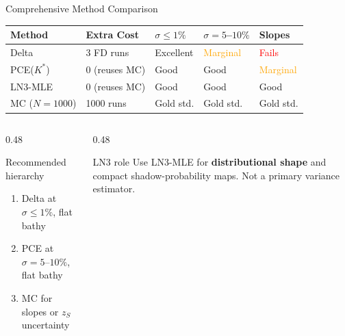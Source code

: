 \documentclass[aspectratio=169,12pt]{beamer}
\begin{document}
\begin{frame}{Comprehensive Method Comparison}
  \begin{center}
  \renewcommand{\arraystretch}{1.4}
  \begin{tabular}{@{}lllll@{}}
    \toprule
    \textbf{Method} & \textbf{Extra Cost} & \textbf{$\sigma\leq1\%$} & \textbf{$\sigma=5$--$10\%$} & \textbf{Slopes} \\
    \midrule
    Delta   & 3 FD runs & \textcolor{green!60!black}{Excellent} & \textcolor{orange}{Marginal} & \textcolor{red}{Fails} \\
    PCE($K^*$) & 0 (reuses MC) & \textcolor{green!60!black}{Good} & \textcolor{green!60!black}{Good} & \textcolor{orange}{Marginal} \\
    LN3-MLE & 0 (reuses MC) & \textcolor{green!60!black}{Good} & \textcolor{green!60!black}{Good} & \textcolor{green!60!black}{Good} \\
    MC ($N=1000$) & 1000 runs & \textcolor{green!60!black}{Gold std.} & \textcolor{green!60!black}{Gold std.} & \textcolor{green!60!black}{Gold std.} \\
    \bottomrule
  \end{tabular}
  \end{center}

  \vspace{0.8em}
  \begin{columns}
    \begin{column}{0.48\textwidth}
      \begin{block}{Recommended hierarchy}
        \begin{enumerate}
          \item Delta at $\sigma\leq1\%$, flat bathy
          \item PCE at $\sigma=5$--$10\%$, flat bathy
          \item MC for slopes or $z_S$ uncertainty
        \end{enumerate}
      \end{block}
    \end{column}
    \begin{column}{0.48\textwidth}
      \begin{alertblock}{LN3 role}
        Use LN3-MLE for \textbf{distributional shape}
        and compact shadow-probability maps.
        Not a primary variance estimator.
      \end{alertblock}
    \end{column}
  \end{columns}
\end{frame}
\end{document}
